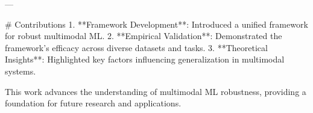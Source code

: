 ---

# Contributions
1. **Framework Development**: Introduced a unified framework for robust multimodal ML.
2. **Empirical Validation**: Demonstrated the framework's efficacy across diverse datasets and tasks.
3. **Theoretical Insights**: Highlighted key factors influencing generalization in multimodal systems.

This work advances the understanding of multimodal ML robustness, providing a foundation for future research and applications.